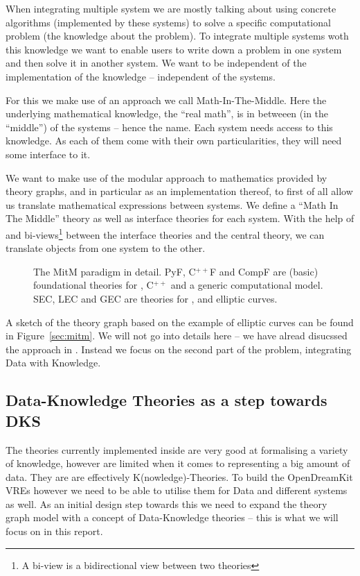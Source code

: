 When integrating multiple system we are mostly talking about using concrete algorithms
(implemented by these systems) to solve a specific computational problem (the knowledge
about the problem). To integrate multiple systems woth this knowledge we want to enable
users to write down a problem in one system and then solve it in another system. We want
to be independent of the implementation of the knowledge -- independent of the systems.

For this we make use of an approach we call Math-In-The-Middle. Here the underlying
mathematical knowledge, the ``real math'', is in betweeen (in the ``middle'') of the
systems -- hence the name. Each system needs access to this knowledge. As each of them
come with their own particularities, they will need some interface to it.

We want to make use of the modular approach to mathematics provided by theory graphs, and
in particular \MMT as an implementation thereof, to first of all allow us translate
mathematical expressions between systems. We define a ``Math In The Middle'' theory as
well as interface theories for each system. With the help of \MMT and bi-views\footnote{A
  bi-view is a bidirectional view between two theories} between the interface theories and
the central theory, we can translate objects from one system to the other.

\begin{figure}[ht]\centering
  \def\myxscale{3}\def\myyscale{1.2}
  
  \caption{The MitM paradigm in detail. PyF, C${}^{++}$F and CompF are (basic)
    foundational theories for \python, C${}^{++}$ and a generic computational model. SEC,
    LEC and GEC are theories for \Sage, \LMFDB and \GAP elliptic curves.}\label{fig:mitm}
\end{figure}

A sketch of the theory graph based on the example of elliptic curves can be found in
Figure~\ref{sec:mitm}. We will not go into details here -- we have alread disucssed the
approach in \cite{DehKohKon:iop16}. Instead we focus on the second part of the problem,
integrating Data with Knowledge.

\subsection{Data-Knowledge Theories as a step towards DKS}\label{sec:introfinal}

The theories currently implemented inside \MMT are very good at formalising a variety of
knowledge, however are limited when it comes to representing a big amount of data. They
are are effectively K(nowledge)-Theories. To build the OpenDreamKit VREs however we need
to be able to utilise them for Data and different systems as well. As an initial design
step towards this we need to expand the theory graph model with a concept of
Data-Knowledge theories -- this is what we will focus on in this report.

